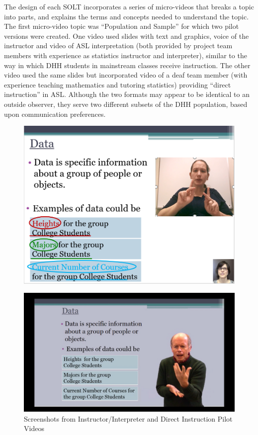\documentclass[11.5pt]{sig-alternate} %
\begin{document}
\begin{large}
The design of each SOLT incorporates a series of micro-videos that breaks a topic into parts, and explains the terms and concepts needed to understand the topic. The first micro-video topic was “Population and Sample” for which two pilot versions were created. One video used slides with text and graphics, voice of the instructor and video of ASL interpretation (both provided by project team members with experience as statistics instructor and interpreter), similar to the way in which DHH students in mainstream classes receive instruction. The other video used the same slides but incorporated video of a deaf team member (with experience teaching mathematics and tutoring statistics) providing “direct instruction” in ASL. Although the two formats may appear to be identical to an outside observer, they serve two different subsets of the DHH population, based upon communication preferences. 

\begin{figure}[h]
    \centering
    \includegraphics[width=1\linewidth]{Fig_3a.png}
\end{figure}

\begin{figure}[h]
    \centering
    \includegraphics[width=1\linewidth]{Fig_3b.png}
    \caption{Screenshots from Instructor/Interpreter and Direct Instruction Pilot Videos}
\end{figure}


\end{large}
\end{document}
